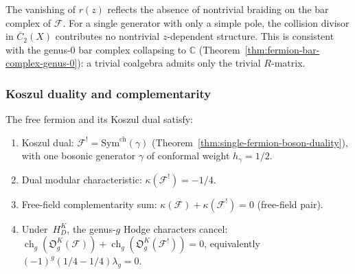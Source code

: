 \begin{remark}
\label{rem:fermion-rmatrix-trivial}
The vanishing of $r(z)$ reflects the absence of nontrivial
braiding on the bar complex of $\mathcal{F}$. For a single
generator with only a simple pole, the collision divisor in
$\overline{C}_2(X)$ contributes no nontrivial $z$-dependent
structure. This is consistent with the genus-$0$ bar complex
collapsing to $\mathbb{C}$
\textup{(}Theorem~\ref{thm:fermion-bar-complex-genus-0}\textup{)}:
a trivial coalgebra admits only the trivial $R$-matrix.
\end{remark}

\subsubsection{Koszul duality and complementarity}
\label{sec:fermion-complementarity}%
%
%

\begin{proposition}
\label{prop:fermion-complementarity}
The free fermion and its Koszul dual satisfy:
\begin{enumerate}
\item\label{item:fermion-kd}
 Koszul dual:
 $\mathcal{F}^! = \mathrm{Sym}^{\mathrm{ch}}(\gamma)$
 \textup{(}Theorem~\textup{\ref{thm:single-fermion-boson-duality}}\textup{)},
 with one bosonic generator $\gamma$ of conformal weight $h_\gamma = 1/2$.
\item\label{item:fermion-kappa-dual}
 Dual modular characteristic:
 $\kappa(\mathcal{F}^!) = -1/4$.
\item\label{item:fermion-complementarity-sum}
 Free-field complementarity sum:
 $\kappa(\mathcal{F}) + \kappa(\mathcal{F}^!) = 0$ \textup{(}free-field pair\textup{)}.
\item\label{item:fermion-genus-complementarity}
 Under~$H_D^K$, the genus-$g$ Hodge characters cancel:
 $\operatorname{ch}_g(\mathfrak O_g^K(\mathcal F))
 +\operatorname{ch}_g(\mathfrak O_g^K(\mathcal F^!))=0$,
 equivalently $(-1)^g(1/4-1/4)\lambda_g=0$.
\end{enumerate}
\end{proposition}

